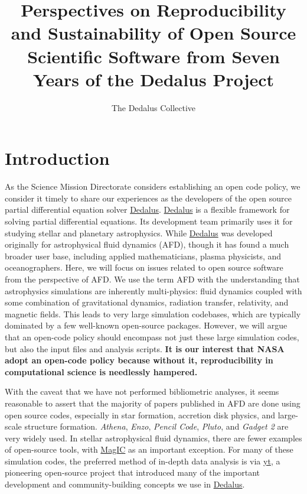 \documentclass[12pt, preprint]{aastex}
\title{Perspectives on Reproducibility and Sustainability of Open Source Scientific Software from Seven Years of the Dedalus Project}
\author{The Dedalus Collective}
\newcommand{\dedalus}{\href{http://dedalus-project.org}{Dedalus}}
\begin{document}
\maketitle

\section{Introduction}
\label{sec:intro}
As the Science Mission Directorate considers establishing an open code policy, we consider it timely to share our experiences as the developers of the open source partial differential equation solver \dedalus{}. \dedalus{} is a flexible framework for solving partial differential equations. Its development team primarily uses it for studying stellar and planetary astrophysics. While \dedalus{} was developed originally for astrophysical fluid dynamics (AFD), though it has found a much broader user base, including applied mathematicians, plasma physicists, and oceanographers. Here, we will focus on issues related to open source software from the perspective of AFD. We use the term AFD with the understanding that astrophysics simulations are inherently multi-physics: fluid dynamics coupled with some combination of gravitational dynamics, radiation transfer, relativity, and magnetic fields. This leads to very large simulation codebases, which are typically dominated by a few well-known open-source packages. However, we will argue that an open-code policy should encompass not just these large simulation codes, but also the input files and analysis scripts. \textbf{It is our interest that NASA adopt an open-code policy because without it, reproducibility in computational science is needlessly hampered.} 

With the caveat that we have not performed bibliometric analyses, it seems reasonable to assert that the majority of papers published in AFD are done using open source codes, especially in star formation, accretion disk physics, and large-scale structure formation. \emph{Athena}, \emph{Enzo}, \emph{Pencil Code}, \emph{Pluto}, and \emph{Gadget 2} are very widely used. In stellar astrophysical fluid dynamics, there are fewer examples of open-source tools, with \href{http://magic-sph.github.io}{MagIC} as an important exception. For many of these simulation codes, the preferred method of in-depth data analysis is via \href{http://yt-project.org}{yt}, a pioneering open-source project that introduced many of the important development and community-building concepts we use in \dedalus{}. 
\end{document}
